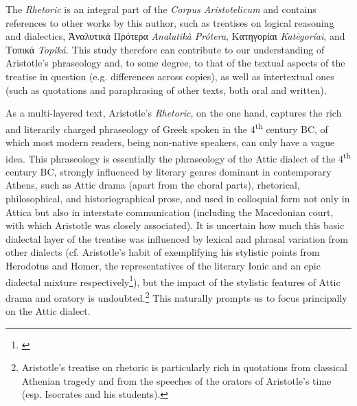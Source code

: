 \documentclass[output=paper,colorlinks,citecolor=brown]{langscibook}
\begin{document}
The \textit{Rhetoric} is an integral part of the \textit{Corpus Aristotelicum} and contains references to other works by this author, such as treatises on logical reasoning and dialectics, Ἀναλυτικά Πρότερα \textit{Analutikà Prótera}, Κατηγορίαι \textit{Katēgoríai}, and Τοπικά \textit{Topiká}. This study therefore can contribute to our understanding of Aristotle’s phraseology and, to some degree, to that of the textual aspects of the treatise in question (e.g. differences across copies), as well as intertextual ones (such as quotations and paraphrasing of other texts, both oral and written).

As a multi-layered text, Aristotle’s \textit{Rhetoric}, on the one hand, captures the rich and literarily charged phraseology of Greek spoken in the 4\textsuperscript{th} century BC, of which most modern readers, being non-native speakers, can only have a vague idea. This phraseology is essentially the phraseology of the Attic dialect of the 4\textsuperscript{th} century BC, strongly influenced by literary genres dominant in contemporary Athens, such as Attic drama (apart from the choral parts), rhetorical, philosophical, and historiographical prose, and used in colloquial form not only in Attica but also in interstate communication (including the Macedonian court, with which Aristotle was closely associated). It is uncertain how much this basic dialectal layer of the treatise was influenced by lexical and phrasal variation from other dialects (cf. Aristotle’s habit of exemplifying his stylistic points from Herodotus and Homer, the representatives of the literary Ionic and an epic dialectal mixture respectively\footnote{\citet[168]{MorpurgoDavies2002}}), but the impact of the stylistic features of Attic drama and oratory is undoubted.\footnote{Aristotle’s treatise on rhetoric is particularly rich in quotations from classical Athenian tragedy and from the speeches of the orators of Aristotle’s time (esp. Isocrates and his students).} This naturally prompts us to focus principally on the Attic dialect.
\end{document}
